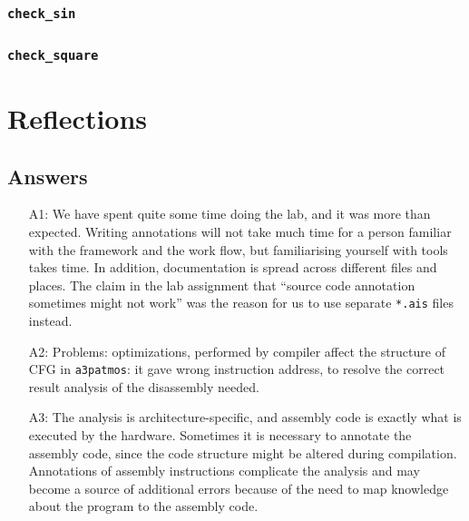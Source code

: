 \documentclass[12pt,a4paper,titlepage,oneside]{article}
\begin{document}
\subsubsection{\texttt{check\_sin}}



\subsubsection{\texttt{check\_square}}





\newpage
\section{Reflections}



\subsection{Answers}
\begin{itemize}

\item[A1:]
  We have spent quite some time doing the lab, and
  it was more than expected. Writing annotations will not take much
  time for a person familiar with the framework and the work flow, but
  familiarising yourself with tools takes time. In addition,
  documentation is spread across different files and places. The claim
  in the lab assignment that ``source code annotation sometimes might not 
  work'' was the reason for us to use separate \texttt{*.ais} files
  instead. 

\item[A2:]
  Problems: optimizations, performed by compiler affect the structure
  of CFG in \texttt{a3patmos}: it gave wrong instruction address, to
  resolve the correct result analysis of the disassembly needed.

\item[A3:]
  The analysis is architecture-specific, and assembly code
  is exactly what is executed by the hardware. Sometimes it is 
  necessary to annotate the assembly code, since the code structure might be
  altered during compilation. Annotations of assembly instructions
  complicate the analysis and may become a source of additional errors
  because of the need to map knowledge about the program to the assembly code.

\end{itemize}
\end{document}

